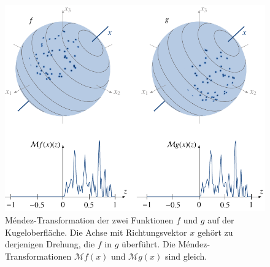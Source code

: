 %
%
%
\begin{figure}
\centering
\includegraphics{chapters/070-nichtkomm/images/MTransformExamples2.pdf}
\caption{Méndez-Transformation der zwei Funktionen $f$ und $g$ auf
der Kugeloberfläche.
Die Achse mit Richtungsvektor $x$ gehört zu derjenigen Drehung,
die $f$ in $g$ überführt.
Die Méndez-Transformationen $\mathcal{M}f(x)$
und $\mathcal{M}g(x)$ sind gleich.
\label{buch:nichtkomm:fig:mtex2}}
\end{figure}
